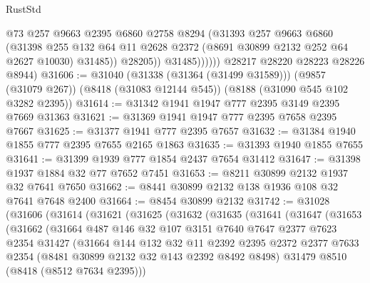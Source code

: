 \begin{lexlean}{RustStd}
\begin{coremodule}
                      @73
                      @257
                      @9663
                      @2395
                      @6860
                      @2758
                      @8294
                      (@31393
                        @257
                        @9663
                        @6860
                        (@31398
                          @255
                          @132
                          @64
                          @11
                          @2628
                          @2372
                          (@8691 @30899 @2132 @252 @64 @2627 @10030)
                          @31485))
                      @28205))
                  @31485))))))
      @28217
      @28220
      @28223
      @28226
      @8944)
@31606 := @31040
    (@31338 (@31364 (@31499 @31589)))
    (@9857 (@31079 @267))
    (@8418 (@31083 @12144 @545))
    (@8188 (@31090 @545 @102 @3282 @2395))
@31614 := @31342 @1941 @1947 @777 @2395 @3149 @2395 @7669 @31363
@31621 := @31369 @1941 @1947 @777 @2395 @7658 @2395 @7667
@31625 := @31377 @1941 @777 @2395 @7657
@31632 := @31384 @1940 @1855 @777 @2395 @7655 @2165 @1863
@31635 := @31393 @1940 @1855 @7655
@31641 := @31399 @1939 @777 @1854 @2437 @7654 @31412
@31647 := @31398 @1937 @1884 @32 @77 @7652 @7451
@31653 := @8211 @30899 @2132 @1937 @32 @7641 @7650
@31662 := @8441 @30899 @2132 @138 @1936 @108 @32 @7641 @7648 @2400
@31664 := @8454 @30899 @2132
@31742 := @31028
    (@31606
      (@31614
        (@31621
          (@31625
            (@31632
              (@31635
                (@31641
                  (@31647
                    (@31653
                      (@31662
                        (@31664
                          @487
                          @146
                          @32
                          @107
                          @3151
                          @7640
                          @7647
                          @2377
                          @7623
                          @2354
                          @31427
                          (@31664
                            @144
                            @132
                            @32
                            @11
                            @2392
                            @2395
                            @2372
                            @2377
                            @7633
                            @2354
                            (@8481 @30899 @2132 @32 @143 @2392 @8492 @8498)
                            @31479
                            @8510
                            (@8418 (@8512 @7634 @2395)))

\end{coremodule}
\end{lexlean}
